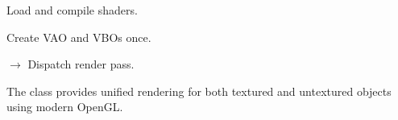 \documentclass[a4paper,10pt,english,openany,oneside]{sphinxmanual}
\begin{document}
\begin{fulllineitems}
\begin{fulllineitems}
\begin{quote}
\begin{description}
\end{description}\end{quote}

\end{fulllineitems}


\begin{fulllineitems}
\label{\detokenize{api/renderer:picogl.renderer.object.ObjectRenderer.initialize_shaders}}
\pysigstartsignatures
\pysiglinewithargsret
{}
{}
{}
\pysigstopsignatures
\sphinxAtStartPar
Load and compile shaders.

\end{fulllineitems}


\begin{fulllineitems}
\label{\detokenize{api/renderer:picogl.renderer.object.ObjectRenderer.initialize}}
\pysigstartsignatures
\pysiglinewithargsret
{}
{}
{}
\pysigstopsignatures
\sphinxAtStartPar
Create VAO and VBOs once.

\end{fulllineitems}


\begin{fulllineitems}
\label{\detokenize{api/renderer:picogl.renderer.object.ObjectRenderer.render}}
\pysigstartsignatures
\pysiglinewithargsret
{}
{}
{{ $\rightarrow$ }}
\pysigstopsignatures
\sphinxAtStartPar
Dispatch render pass.

\end{fulllineitems}


\end{fulllineitems}


\sphinxAtStartPar
The  class provides unified rendering for both textured and untextured objects using modern OpenGL.
\end{document}
